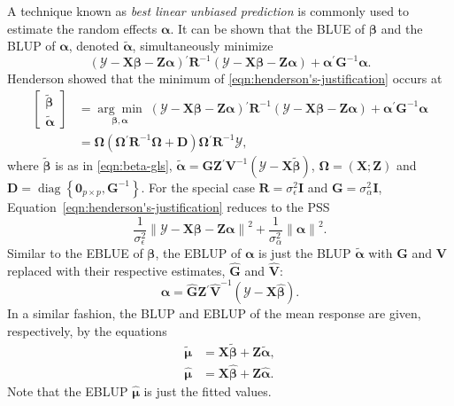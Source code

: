 \documentclass[cmfont,usenames,dvipsnames,leqno]{afit-etd}\usepackage[]{graphicx}\usepackage[]{color}
\newcommand{\norm}[1]{\left\|#1\right\|}
\newcommand{\trans}{\ensuremath{^\prime}}
\newcommand{\bc}[1]{\ensuremath{\bm{\mathcal{#1}}}}
\newcommand{\wh}[1]{\ensuremath{\widehat{#1}}}
\newcommand{\wt}[1]{\ensuremath{\widetilde{#1}}}
\newcommand{\argmin}[1]{\underset{#1}{\operatorname{arg}\!\operatorname{min}}\;}
\newcommand{\diag}{\operatorname{diag}}
\newcommand{\X}{\ensuremath{\bm{X}}}
\newcommand{\Z}{\ensuremath{\bm{Z}}}
\begin{document}
A technique known as \textit{best linear unbiased prediction} is commonly used to estimate the random effects $\bm{\alpha}$. It can be shown \citep{henderson_sire_1973} that the \ac{BLUE} of $\bm{\beta}$ and the \ac{BLUP} of $\bm{\alpha}$, denoted $\wt{\bm{\alpha}}$, simultaneously minimize
\begin{equation}
\label{eqn:henderson's-justification}
  (\bc{Y} - \X\bm{\beta} - \Z\bm{\alpha})\trans\bm{R}^{-1}(\bc{Y} - \X\bm{\beta} - \Z\bm{\alpha}) + \bm{\alpha}\trans\bm{G}^{-1}\bm{\alpha}.
\end{equation} 
Henderson showed that the minimum of \eqref{eqn:henderson's-justification} occurs at
\begin{align*}
  \begin{bmatrix} 
    \wt{\bm{\beta}} \\ \wt{\bm{\alpha}} 
  \end{bmatrix} &= \argmin{\bm{\beta}, \bm{\alpha}} (\bc{Y} - \X\bm{\beta} - \Z\bm{\alpha})\trans\bm{R}^{-1}(\bc{Y} - \X\bm{\beta} - \Z\bm{\alpha}) + \bm{\alpha}\trans\bm{G}^{-1}\bm{\alpha} \\
  &= \bm{\Omega}(\bm{\Omega}\trans\bm{R}^{-1}\bm{\Omega} + \bm{D})\bm{\Omega}\trans\bm{R}^{-1}\bc{Y},
\end{align*}
where $\wt{\bm{\beta}}$ is as in \eqref{eqn:beta-gls}, $\wt{\bm{\alpha}} = \bm{G}\Z\trans\bm{V}^{-1}\left(\bc{Y} - \X\wt{\bm{\beta}}\right)$, $\bm{\Omega} = \left(\X; \Z\right)$ and $\bm{D} = \diag\left\{\bm{0}_{p \times p}, \bm{G}^{-1}\right\}$.
For the special case $\bm{R} = \sigma_\epsilon^2\bm{I}$ and $\bm{G} = \sigma_\alpha^2\bm{I}$, Equation~\eqref{eqn:henderson's-justification} reduces to the \ac{PSS}
\begin{equation}
\label{eqn:lmm-pss}
  \frac{1}{\sigma_\epsilon^2}\norm{\bc{Y} - \X\bm{\beta} - \Z\bm{\alpha}}^2 +\frac{1}{\sigma_\alpha^2}\norm{\bm{\alpha}}^2.
\end{equation}
Similar to the \ac{EBLUE} of $\bm{\beta}$, the \ac{EBLUP} of $\bm{\alpha}$ is just the \ac{BLUP} $\wt{\bm{\alpha}}$ with $\bm{G}$ and $\bm{V}$ replaced with their respective estimates, $\widehat{\bm{G}}$ and $\widehat{\bm{V}}$:
\begin{equation}
\label{eqn:alpha-eblup}
  \wh{\bm{\alpha}} = \widehat{\bm{G}}\Z\trans\widehat{\bm{V}}^{-1}\left(\bc{Y} - \X\wh{\bm{\beta}}\right).
\end{equation} 
In a similar fashion, the \ac{BLUP} and \ac{EBLUP} of the mean response are given, respectively, by the equations
\begin{align}
  \widetilde{\bm{\mu}} &= \X\wt{\bm{\beta}} + \Z\wt{\bm{\alpha}}, \label{eqn:mu-blup} \\
  \wh{\bm{\mu}} &= \X\wh{\bm{\beta}} + \Z\wh{\bm{\alpha}}. \label{eqn:mu-eblup}
\end{align}
Note that the \ac{EBLUP} $\wh{\bm{\mu}}$ is just the fitted values.
\end{document}
